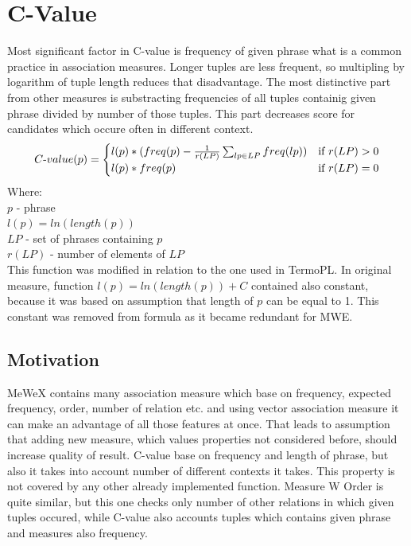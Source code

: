 \section{C-Value}
Most significant factor in C-value is frequency of given phrase what is a common practice in association measures. 
Longer tuples are less frequent, so multipling by logarithm of tuple length reduces that disadvantage. 
The most distinctive part from other measures is substracting frequencies of all tuples containig given phrase divided by number of those tuples. 
This part decreases score for candidates which occure often in different context.
\[ 
    C{\text -}value(p) = \begin{cases}
        l(p) * (freq(p) - \frac{1}{r(LP)}\sum_{lp \in LP}{freq(lp)}) & \text{if } r(LP) > 0\\
        l(p) * freq(p)            & \text{if } r(LP) = 0\\
    \end{cases}
\]
Where: \\
\(p\)  - phrase \\
\(l(p) = ln(length(p))\) \\
\(LP\)  - set of phrases containing \(p\) \\
\(r(LP)\) - number of elements of \(LP\) \\

This function was modified in relation to the one used in TermoPL. In original measure, function \(l(p) = ln(length(p)) + C\) 
contained also constant, because it was based on assumption that length of \(p\) can be equal to 1. This constant was removed 
from formula as it became redundant for MWE.

\subsection{Motivation}
MeWeX contains many association measure which base on frequency, expected frequency, order, number of relation etc. 
and using vector association measure it can make an advantage of all those features at once. That leads to assumption that adding new measure, 
which values properties not considered before, should increase quality of result. C-value base on frequency and length of phrase, 
but also it takes into account number of different contexts it takes. This property is not covered by any other already implemented function.
Measure W Order is quite similar, but this one checks only number of other relations in which given tuples occured, 
while C-value also accounts tuples which contains given phrase and measures also frequency.


